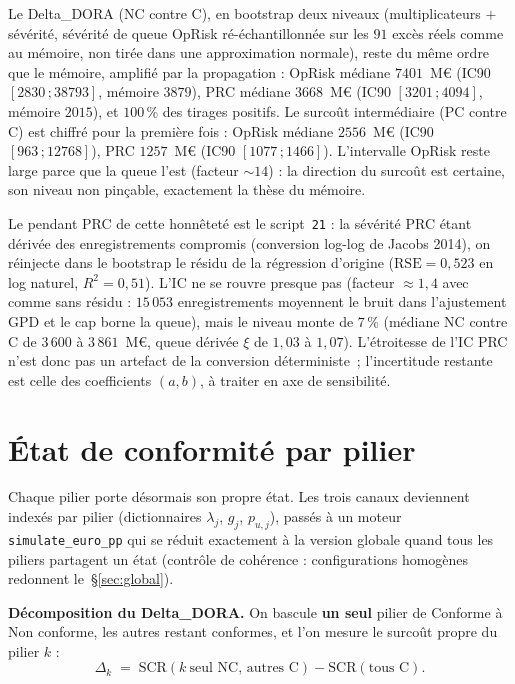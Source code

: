\documentclass[11pt,a4paper]{article}
\begin{document}
Le Delta\_DORA (NC contre C), en bootstrap deux niveaux (multiplicateurs $+$ sévérité, sévérité
de queue OpRisk ré-échantillonnée sur les $91$ excès réels comme au mémoire, non tirée dans une
approximation normale), reste du même ordre que le mémoire, amplifié par la propagation : OpRisk
médiane $7401$~M\euro{} (IC90 $[2830\,;38793]$, mémoire $3879$), PRC médiane $3668$~M\euro{}
(IC90 $[3201\,;4094]$, mémoire $2015$), et $100\,\%$ des tirages positifs. Le surcoût
intermédiaire (PC contre C) est chiffré pour la première fois : OpRisk médiane $2556$~M\euro{}
(IC90 $[963\,;12768]$), PRC $1257$~M\euro{} (IC90 $[1077\,;1466]$). L'intervalle OpRisk reste
large parce que la queue l'est (facteur $\sim 14$) : la direction du surcoût est certaine, son
niveau non pinçable, exactement la thèse du mémoire.

Le pendant PRC de cette honnêteté est le script~\texttt{21} : la sévérité PRC étant dérivée
des enregistrements compromis (conversion log-log de Jacobs 2014), on réinjecte dans le
bootstrap le résidu de la régression d'origine ($\mathrm{RSE} = 0{,}523$ en log naturel,
$R^2 = 0{,}51$). L'IC ne se rouvre presque pas (facteur $\approx 1{,}4$ avec comme sans
résidu : $15\,053$ enregistrements moyennent le bruit dans l'ajustement GPD et le cap borne
la queue), mais le niveau monte de $7\,\%$ (médiane NC contre C de $3\,600$ à
$3\,861$~M\euro, queue dérivée $\xi$ de $1{,}03$ à $1{,}07$). L'étroitesse de l'IC PRC n'est
donc pas un artefact de la conversion déterministe~; l'incertitude restante est celle des
coefficients $(a,b)$, à traiter en axe de sensibilité.

\section{État de conformité par pilier}
\label{sec:pilier}

Chaque pilier porte désormais son propre état. Les trois canaux deviennent indexés par pilier
(dictionnaires $\lambda_j$, $g_j$, $p_{u,j}$), passés à un moteur \texttt{simulate\_euro\_pp}
qui se réduit exactement à la version globale quand tous les piliers partagent un état
(contrôle de cohérence : configurations homogènes redonnent le~\S\ref{sec:global}).

\begin{cle}
\textbf{Décomposition du Delta\_DORA.} On bascule \textbf{un seul} pilier de Conforme à Non
conforme, les autres restant conformes, et l'on mesure le surcoût propre du pilier $k$ :
\[
\Delta_k \;=\; \mathrm{SCR}(k~\text{seul NC, autres C}) - \mathrm{SCR}(\text{tous C}).
\]
\end{cle}
\end{document}
